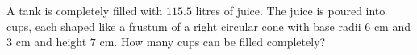 A tank is completely filled with $115.5$ litres of juice. The juice is poured into cups, each shaped like a frustum of a right circular cone with base radii $6$ cm and $3$ cm and height $7$ cm. How many cups can be filled completely?
